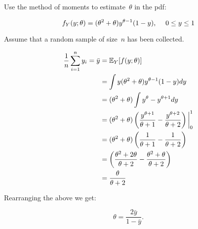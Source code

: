 \begin{problem}
   Use the method of moments to estimate~$\theta$ in the pdf:

  \begin{equation*}
    f_{Y}(y;\theta) = (\theta^{2} + \theta) y^{\theta - 1} (1 - y)\text{,} \hspace{0.5cm} 0 \leq y \leq 1
  \end{equation*}

  \noindent
  Assume that a random sample of size~$n$ has been collected.
\end{problem}

\begin{align}
  \frac{1}{n} \sum_{i=1}^{n} y_i = \bar{y} &= \mathbb{E}_{Y}\lbrack f(y;\theta)\rbrack \\
                     &= \int  y(\theta^{2} + \theta) y^{\theta - 1} (1 - y) dy \\
                     &= (\theta^{2} + \theta) \int y^{\theta} - y^{\theta + 1} dy \\
                     &= (\theta^{2} + \theta) \left( \frac{y^{\theta + 1}}{\theta + 1} -\frac{y^{\theta + 2}}{\theta + 2} \right)\bigg\vert_{0}^{1} \\
                     &= (\theta^{2} + \theta) \left( \frac{1}{\theta + 1} - \frac{1}{\theta + 2} \right)\\
                     &= \left( \frac{\theta^{2} + 2\theta}{\theta + 2} - \frac{\theta^{2} + \theta}{\theta + 2} \right)\\
                     &= \frac{\theta}{\theta + 2}
\end{align}

Rearranging the above we get:

\begin{equation}
  \theta = \boxed{\frac{2\bar{y}}{1 - \bar{y}}}.
\end{equation}
